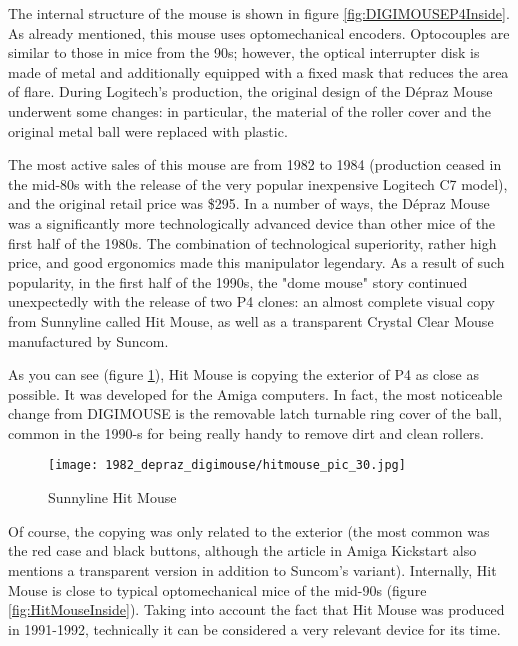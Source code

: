 \documentclass[11pt, a4paper]{article}
\begin{document}
The internal structure of the mouse is shown in figure \ref{fig:DIGIMOUSEP4Inside}. As already mentioned, this mouse uses optomechanical encoders. Optocouples are similar to those in mice from the 90s; however, the optical interrupter disk is made of metal and additionally equipped with a fixed mask that reduces the area of flare. During Logitech's production, the original design of the D\'epraz Mouse underwent some changes: in particular, the material of the roller cover and the original metal ball \cite{oldmouse} were replaced with plastic.

The most active sales of this mouse are from 1982 to 1984 (production ceased in the mid-80s with the release of the very popular inexpensive Logitech C7 model), and the original retail price was \$295. In a number of ways, the D\'epraz Mouse was a significantly more technologically advanced device than other mice of the first half of the 1980s. The combination of technological superiority, rather high price, and good ergonomics made this manipulator legendary. As a result of such popularity, in the first half of the 1990s, the "dome mouse" story continued unexpectedly with the release of two P4 clones: an almost complete visual copy from Sunnyline called Hit Mouse\cite{sunnyline}, as well as a transparent Crystal Clear Mouse manufactured by Suncom\cite{suncom}.

As you can see (figure \ref{fig:HitMousePic}), Hit Mouse is copying the exterior of P4 as close as possible. It was developed for the Amiga computers. In fact, the most noticeable change from DIGIMOUSE is the removable latch turnable ring cover of the ball, common in the 1990-s for being really handy to remove dirt and clean rollers.

\begin{figure}[h]
   \centering
    \texttt{[image: 1982\_depraz\_digimouse/hitmouse\_pic\_30.jpg]}
    \caption{Sunnyline Hit Mouse}
    \label{fig:HitMousePic}
\end{figure}

Of course, the copying was only related to the exterior (the most common was the red case and black buttons, although the article in Amiga Kickstart also mentions \cite{sunnyline} a transparent version in addition to Suncom's variant). Internally, Hit Mouse is close to typical optomechanical mice of the mid-90s (figure \ref{fig:HitMouseInside}). Taking into account the fact that Hit Mouse was produced in 1991-1992, technically it can be considered a very relevant device for its time.
\end{document}
